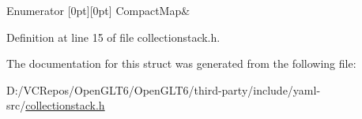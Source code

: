 \begin{DoxyEnumFields}{Enumerator}
[0pt][0pt]{}\mbox{\label{struct_y_a_m_l_1_1_collection_type_a58f952b2cc7ebfe8423b5f50ed759badabd99ac5038ed0b09395bfe9d5d8e47a5}} 
Compact\+Map&\\
\hline

\end{DoxyEnumFields}


Definition at line 15 of file collectionstack.\+h.



The documentation for this struct was generated from the following file\+:\begin{DoxyCompactItemize}
\item 
D\+:/\+V\+C\+Repos/\+Open\+G\+L\+T6/\+Open\+G\+L\+T6/third-\/party/include/yaml-\/src/\mbox{\hyperlink{collectionstack_8h}{collectionstack.\+h}}\end{DoxyCompactItemize}
